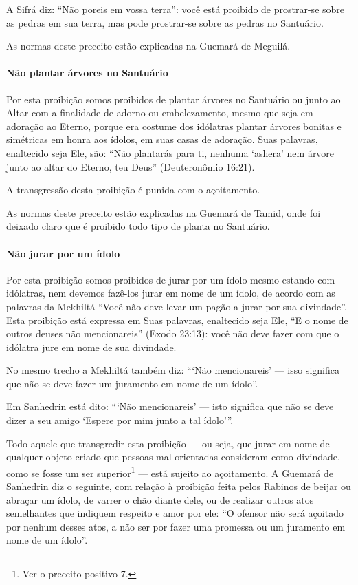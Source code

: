 A Sifrá diz: ``Não poreis em vossa terra'': você está proibido de
prostrar-se sobre as pedras em sua terra, mas pode prostrar-se sobre as
pedras no Santuário.

As normas deste preceito estão explicadas na Guemará de Meguilá.

\paragraph{Não plantar árvores no Santuário}

Por esta proibição somos proibidos de plantar árvores no Santuário ou
junto ao Altar com a finalidade de adorno ou embelezamento, mesmo que
seja em adoração ao Eterno, porque era costume dos idólatras plantar
árvores bonitas e simétricas em honra aos ídolos, em suas casas de
adoração. Suas palavras, enaltecido seja Ele, são: ``Não plantarás para
ti, nenhuma `ashera' nem árvore junto ao altar do Eterno, teu Deus''
(Deuteronômio 16:21).

A transgressão desta proibição é punida com o açoitamento.

As normas deste preceito estão explicadas na Guemará de Tamid, onde foi
deixado claro que é proibido todo tipo de planta no Santuário.

\paragraph{Não jurar por um ídolo}

Por esta proibição somos proibidos de jurar por um ídolo mesmo estando
com idólatras, nem devemos fazê-los jurar em nome de um ídolo, de acordo
com as palavras da Mekhiltá ``Você não deve levar um pagão a jurar por
sua divindade''. Esta proibição está expressa em Suas palavras,
enaltecido seja Ele, ``E o nome de outros deuses não mencionareis''
(Exodo 23:13): você não deve fazer com que o idólatra jure em nome de
sua divindade.

No mesmo trecho a Mekhiltá também diz: ```Não mencionareis' --- isso
significa que não se deve fazer um juramento em nome de um ídolo''.

Em Sanhedrin está dito: ```Não mencionareis' --- isto significa que não
se deve dizer a seu amigo `Espere por mim junto a tal ídolo'''.

Todo aquele que transgredir esta proibição --- ou seja, que jurar em
nome de qualquer objeto criado que pessoas mal orientadas consideram
como divindade, como se fosse um ser superior\footnote{Ver o preceito positivo 7.} ---
está sujeito ao açoitamento. A Guemará de Sanhedrin diz o seguinte, com
relação à proibição feita pelos Rabinos de beijar ou abraçar um ídolo,
de varrer o chão diante dele, ou de realizar outros atos semelhantes que
indiquem respeito e amor por ele: ``O ofensor não será açoitado por
nenhum desses atos, a não ser por fazer uma promessa ou um juramento em
nome de um ídolo''.

